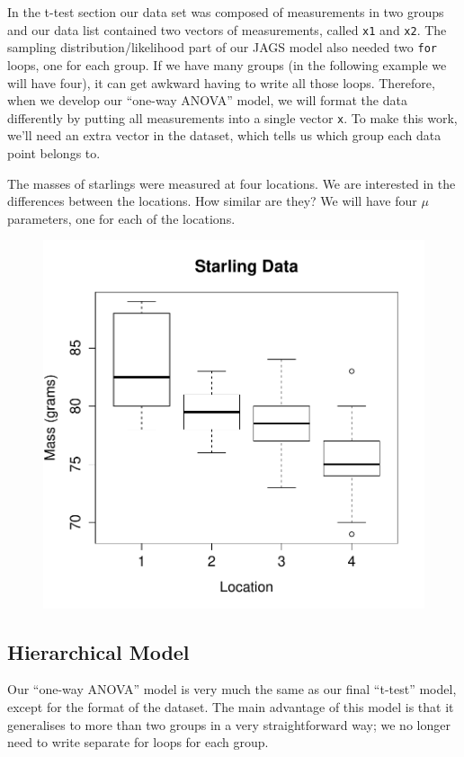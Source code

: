 In the t-test section our data set was composed of measurements in two groups
and our data list contained two vectors of measurements, called {\tt x1} and
{\tt x2}. The sampling distribution/likelihood part of our JAGS model also
needed two {\tt for} loops, one for each group.
If we have many groups (in the following example we will have four),
it can get awkward having to write all those loops. Therefore, when we develop
our ``one-way ANOVA'' model, we will format the data differently by putting
all measurements into a single vector {\tt x}. To make this work, we'll need
an extra vector in the dataset, which tells us which group each data point
belongs to.

The masses of starlings were measured at four locations. We are interested
in the differences between the locations. How similar are they? We will have
four $\mu$ parameters, one for each of the locations.

\begin{figure}[ht!]
\begin{center}
\includegraphics[scale=0.6]{Figures/starling.pdf}
\end{center}
\end{figure}


\subsection{Hierarchical Model}
Our ``one-way ANOVA'' model is very much the same as our final ``t-test'' model,
except for the format of the dataset.
The main advantage of this model is that it generalises to more than two groups
in a very straightforward way; we no longer need to write separate for loops
for each group.

